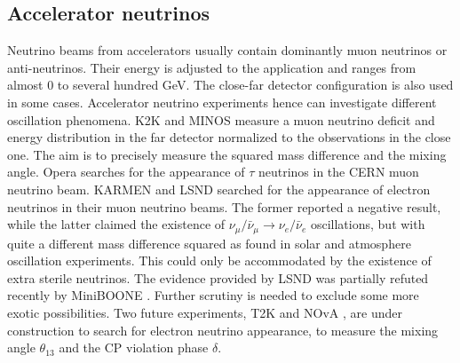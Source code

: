 \subsection{Accelerator  neutrinos}
\label{sec:acce}
Neutrino beams from accelerators usually contain dominantly muon neutrinos or anti-neutrinos. Their energy is adjusted to the application and ranges from almost 0 to several hundred GeV. The close-far detector configuration is also used in some cases.  Accelerator neutrino experiments hence can investigate different oscillation phenomena. K2K \cite{K2K06} and MINOS \cite{Min06} measure a muon neutrino deficit and energy distribution in the far detector normalized to the observations in the close one. The aim is to precisely measure the squared mass difference and the mixing angle. Opera \cite{Ope06} searches for the appearance of $\tau$ neutrinos in the CERN muon neutrino beam. KARMEN \cite{Kar03} and LSND \cite{Dod06} searched for the appearance of electron neutrinos in their muon neutrino beams. The former reported a negative result, while the latter claimed the existence of $\nu_{\mu}/\bar{\nu}_{\mu} \rightarrow \nu_{e}/\bar{\nu}_{e}$ oscillations, but with quite a different mass difference squared as found in solar and atmosphere oscillation experiments. This could only be accommodated by the existence of extra sterile neutrinos. The evidence provided by LSND was partially refuted recently by MiniBOONE \cite{Agu07}. Further scrutiny is needed to exclude some more exotic possibilities. Two future experiments, T2K \cite{T2K05} and NOvA \cite{Nov05}, are under construction to search for electron neutrino appearance, to measure the mixing angle $\theta_{13}$ and the CP violation phase $\delta$.

